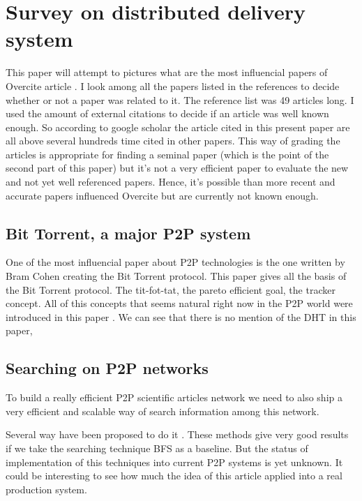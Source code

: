 \section{Survey on distributed delivery system}


This paper will attempt to pictures what are the most influencial papers of Overcite article
\cite{overcite}. I look among all the papers listed in the references to decide whether 
or not a paper was related to it. The reference list was 49 articles long. I used the 
amount of external citations to decide if an article was well known enough. So
according to google scholar the article cited in this present paper are all above several 
hundreds time cited in other papers. This way of grading the articles is appropriate 
for finding a seminal paper (which is the point of the second part of this paper) but 
it's not a very efficient paper to evaluate the new and not yet well referenced papers.
Hence, it's possible than more recent and accurate papers influenced Overcite but are 
currently not known enough.

\subsection{Bit Torrent, a major P2P system}

One of the most influencial paper about P2P technologies is the one written by Bram 
Cohen creating the Bit Torrent protocol. This paper gives all the basis of the Bit Torrent protocol.
The tit-fot-tat, the pareto efficient goal, the tracker concept. All of this concepts that seems natural
right now in the P2P world were introduced in this paper \cite{Cohen03incentivesbuild}.
We can see that there is no mention of the DHT in this paper, 

\subsection{Searching on P2P networks}

To build a really efficient P2P scientific articles network we need to also
ship a very efficient and scalable way of search information among this network.

Several way have been proposed to do it \cite{Yang02improvingsearch}. These methods give
very good results if we take the searching technique BFS as a baseline. But the status of implementation
of this techniques into current P2P systems is yet unknown. It could be interesting to see how much 
the idea of this article applied into a real production system.

